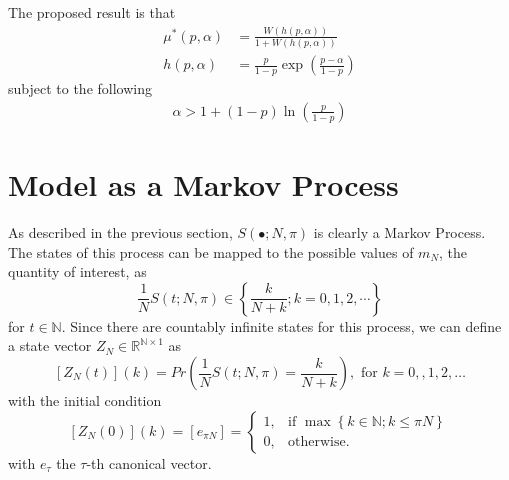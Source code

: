 \documentclass{article}
\newcommand{\N}{\mathbb{N}}
\newcommand{\R}{\mathbb{R}}
\newcommand{\sset}[1]{\left\{ #1 \right\}}
\newcommand{\ppar}[1]{\left( #1 \right)}
\newcommand{\spar}[1]{\left[ #1 \right]}
\begin{document}
The proposed result is that
\begin{align}
    {\mu^*}\ppar{p, \alpha} &= \frac{W\ppar{h\ppar{p, \alpha}}}{1+W\ppar{h\ppar{p, \alpha}}}
    \\
    h\ppar{p, \alpha} &=
    \frac{p}{1-p} \exp{\ppar{\frac{p-\alpha}{1-p}}}
\end{align}
subject to the following
\begin{align}
    \alpha > 1 + \ppar{1-p} \ln{\ppar{\frac{p}{1-p}}} 
\end{align}

\section{Model as a Markov Process}

As described in the previous section, $S(\bullet; N, \pi)$ is clearly a Markov Process.
%
The states of this process can be mapped to the possible values of $m_N$, the quantity of interest, as
\begin{equation}
    \frac{1}{N} S(t; N, \pi) \in \sset{\frac{k}{N+k}; k = 0, 1, 2, \cdots}
\end{equation}
for $t\in \N$. 
%
Since there are countably infinite states for this process, we can define a state vector $Z_N \in \R^{\N\times 1}$ as
\begin{equation}
    \spar{Z_N(t)}(k) = Pr\ppar{\frac{1}{N} S(t; N, \pi) = \frac{k}{N+k}}, \text{ for } k=0,,1, 2, \dots
\end{equation}
with the initial condition
\begin{equation}
    \spar{Z_N(0)}(k) = \spar{e_{\pi N}} = \begin{cases}
        1, &\text{if } \max\sset{k\in \N; k \leq \pi N} \\
        0, &\text{otherwise.}
    \end{cases}
\end{equation}
with $e_\tau$ the $\tau$-th canonical vector.
\end{document}
